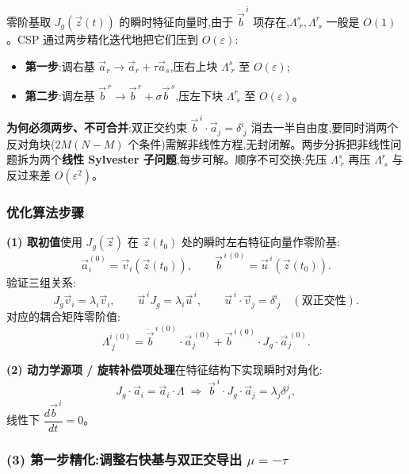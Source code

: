 \documentclass[11pt,a4paper]{article}
\newcommand{\Jg}{J_{\!g}}
\newcommand{\diff}[2]{\dfrac{d #1}{d #2}}
\begin{document}
零阶基取 $\Jg(\vec z(t))$ 的瞬时特征向量时,由于 $\dot{\vec b}^{\,i}$ 项存在,$\Lambda^{s}_{\;r}, \Lambda^{r}_{\;s}$ 一般是 $O(1)$。CSP 通过两步精化迭代地把它们压到 $O(\varepsilon)$:
\begin{itemize}[leftmargin=2em]
\item \textbf{第一步}:调右基 $\vec a_r\to\vec a_r+\tau\vec a_s$,压右上块 $\Lambda^{s}_{\;r}$ 至 $O(\varepsilon)$;
\item \textbf{第二步}:调左基 $\vec b^{\,r}\to\vec b^{\,r}+\sigma\vec b^{\,s}$,压左下块 $\Lambda^{r}_{\;s}$ 至 $O(\varepsilon)$。
\end{itemize}
\textbf{为何必须两步、不可合并}:双正交约束 $\vec b^{\,i}\cdot\vec a_j=\delta^{i}_{\;j}$ 消去一半自由度,要同时消两个反对角块($2M(N-M)$ 个条件)需解非线性方程,无封闭解。两步分拆把非线性问题拆为两个\textbf{线性 Sylvester 子问题},每步可解。顺序不可交换:先压 $\Lambda^{s}_{\;r}$ 再压 $\Lambda^{r}_{\;s}$ 与反过来差 $O(\varepsilon^2)$。

\subsubsection*{优化算法步骤}

\noindent\textbf{(1) 取初值}\quad 使用 $\Jg(\vec z)$ 在 $\vec z(t_0)$ 处的瞬时左右特征向量作零阶基:
\begin{equation}
\vec a_i^{(0)}=\vec v_i(\vec z(t_0)),\qquad \vec b^{\,i\,(0)}=\vec u^{\,i}(\vec z(t_0)).
\end{equation}
验证三组关系:
\begin{equation}
\Jg\vec v_i=\lambda_i\vec v_i,\qquad \vec u^{\,i}\Jg=\lambda_i\vec u^{\,i},\qquad \vec u^{\,i}\cdot\vec v_j=\delta^{i}_{\;j}\quad(\text{双正交性}).
\end{equation}
对应的耦合矩阵零阶值:
\begin{equation}
\Lambda^{i\,(0)}_{\;j}=\dot{\vec b}^{\,i\,(0)}\cdot\vec a_j^{\,(0)}+\vec b^{\,i\,(0)}\cdot\Jg\cdot\vec a_j^{\,(0)}.
\end{equation}

\noindent\textbf{(2) 动力学源项 / 旋转补偿项处理}\quad 在特征结构下实现瞬时对角化:
\begin{equation}
\Jg\cdot\vec a_i=\vec a_i\cdot\Lambda\;\Longrightarrow\;\vec b^{\,i}\cdot\Jg\cdot\vec a_j=\lambda_j\delta^{j}_{\;i},
\end{equation}
线性下 $\diff{\vec b^{\,i}}{t}=0$。

\subsubsection*{(3) 第一步精化:调整右快基与双正交导出 $\mu=-\tau$}
\end{document}
